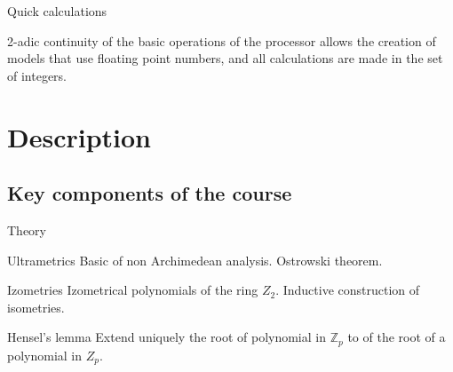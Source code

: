 \begin{frame}{Quick calculations}

 2-adic continuity of the basic operations of the processor allows the creation of models that use floating point numbers, and all calculations are made   in the set of integers.



\end{frame}






\section{Description}

\subsection{Key components of the course}

\begin{frame}{Theory}
\pause
\begin{block}{Ultrametrics}
\pause
Basic of non Archimedean analysis. Ostrowski theorem.

\end{block}
\pause

\begin{block}{Izometries}
\pause
Izometrical polynomials of the ring $Z_2$. Inductive construction of isometries.
\end{block}
\pause
\begin{block}{Hensel's lemma}
\pause
Extend uniquely the root of polynomial in $\mathbb{Z}_p$ to of the root of a polynomial in $Z_p$.
\end{block}


\end{frame}



